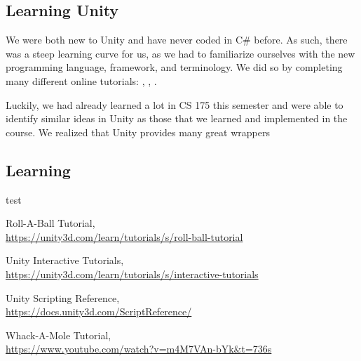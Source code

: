 \documentclass[12pt]{article}
\begin{document}
\subsection{Learning Unity}
We were both new to Unity and have never coded in C\# before. As such, there was a steep learning curve for us, as we had to familiarize ourselves with the new programming language, framework, and terminology. We did so by completing many different online tutorials: \cite{tutorial-rab}, \cite{tutorial1}, \cite{tutorial-wam}.

Luckily, we had already learned a lot in CS 175 this semester and were able to identify similar ideas in Unity as those that we learned and implemented in the course. We realized that Unity provides many great wrappers

\subsection{Learning } 
test

\begin{thebibliography}{999}

    Roll-A-Ball Tutorial, \\
    \url{https://unity3d.com/learn/tutorials/s/roll-ball-tutorial}

    Unity Interactive Tutorials, \\
    \url{https://unity3d.com/learn/tutorials/s/interactive-tutorials}

    Unity Scripting Reference, \\
    \url{https://docs.unity3d.com/ScriptReference/}

    Whack-A-Mole Tutorial, \\
    \url{https://www.youtube.com/watch?v=m4M7VAn-bYk&t=736s}

  \end{thebibliography}
\end{document}
